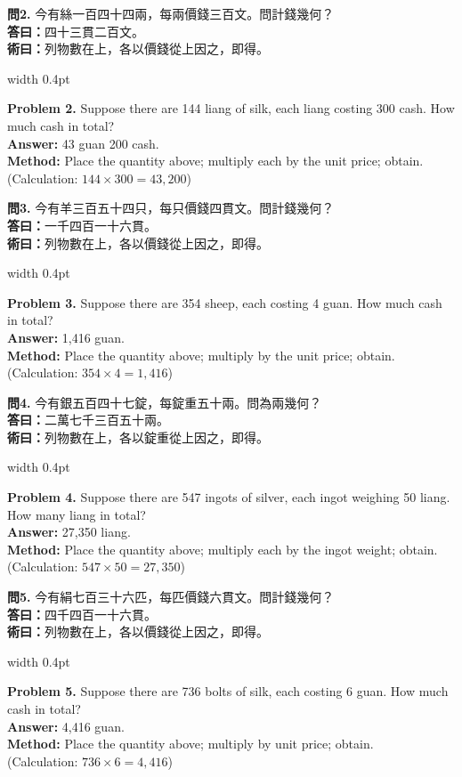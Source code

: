 \documentclass[10pt,a4paper]{article}
\newlength{\cnwidth}
\newlength{\enwidth}
\newcommand{\bilingual}[2]{%
  \noindent%
  \begin{minipage}[t]{\cnwidth}%
    #1%
  \end{minipage}%
  \hfill\vrule width 0.4pt\hfill%
  \begin{minipage}[t]{\enwidth}%
    #2%
  \end{minipage}%
  \par\smallskip%
}
\begin{document}
\bilingual{%
  \textbf{問2.}
  今有絲一百四十四兩，每兩價錢三百文。問計錢幾何？\\
  \textbf{答曰：}四十三貫二百文。\\
  \textbf{術曰：}列物數在上，各以價錢從上因之，即得。
}{%
  \textbf{Problem 2.}
  Suppose there are 144 liang of silk, each liang costing 300 cash.
  How much cash in total?\\
  \textbf{Answer:} 43 guan 200 cash.\\
  \textbf{Method:} Place the quantity above; multiply each by the unit price; obtain.\\
  (Calculation: $144 \times 300 = 43{,}200$)
}

\bilingual{%
  \textbf{問3.}
  今有羊三百五十四只，每只價錢四貫文。問計錢幾何？\\
  \textbf{答曰：}一千四百一十六貫。\\
  \textbf{術曰：}列物數在上，各以價錢從上因之，即得。
}{%
  \textbf{Problem 3.}
  Suppose there are 354 sheep, each costing 4 guan.
  How much cash in total?\\
  \textbf{Answer:} 1,416 guan.\\
  \textbf{Method:} Place the quantity above; multiply by the unit price; obtain.\\
  (Calculation: $354 \times 4 = 1{,}416$)
}

\bilingual{%
  \textbf{問4.}
  今有銀五百四十七錠，每錠重五十兩。問為兩幾何？\\
  \textbf{答曰：}二萬七千三百五十兩。\\
  \textbf{術曰：}列物數在上，各以錠重從上因之，即得。
}{%
  \textbf{Problem 4.}
  Suppose there are 547 ingots of silver, each ingot weighing 50 liang.
  How many liang in total?\\
  \textbf{Answer:} 27,350 liang.\\
  \textbf{Method:} Place the quantity above; multiply each by the ingot weight; obtain.\\
  (Calculation: $547 \times 50 = 27{,}350$)
}

\bilingual{%
  \textbf{問5.}
  今有絹七百三十六匹，每匹價錢六貫文。問計錢幾何？\\
  \textbf{答曰：}四千四百一十六貫。\\
  \textbf{術曰：}列物數在上，各以價錢從上因之，即得。
}{%
  \textbf{Problem 5.}
  Suppose there are 736 bolts of silk, each costing 6 guan.
  How much cash in total?\\
  \textbf{Answer:} 4,416 guan.\\
  \textbf{Method:} Place the quantity above; multiply by unit price; obtain.\\
  (Calculation: $736 \times 6 = 4{,}416$)
}
\end{document}
